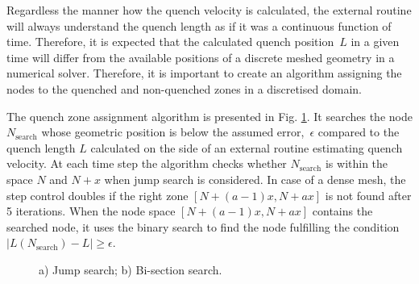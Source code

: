 
Regardless the manner how the quench velocity is calculated, the external routine will always understand the quench length as if it was a continuous function of time. Therefore, it is expected that the calculated quench position~$L$ in a given time will differ from the available positions of a discrete meshed geometry in a numerical solver. Therefore, it is important to create an algorithm assigning the nodes to the quenched and non-quenched zones in a discretised domain.

The quench zone assignment algorithm is presented in Fig. \ref{fig:node_search_algo}. It searches the node $N_\text{search}$ whose geometric position is below the assumed error,~$\epsilon$ compared to the quench length $L$ calculated on the side of an external routine estimating quench velocity. At each time step the algorithm checks whether $N_\text{search}$ is within the space $N$ and ${N+x}$ when jump search is considered. In case of a dense mesh, the step control doubles if the right zone ${[N+(a-1)x, N+ax]}$ is not found after 5 iterations. When the node space ${[N+(a-1)x, N+ax]}$ contains the searched node, it uses the binary search to find the node fulfilling the condition ${\mid L(N_\text{search}) - L \mid \geq \epsilon}$. 

\begin{figure}[H]
\centering
{}
\caption{ a) Jump search; b) Bi-section search.}
\label{fig:node_search_algo}
\end{figure}


